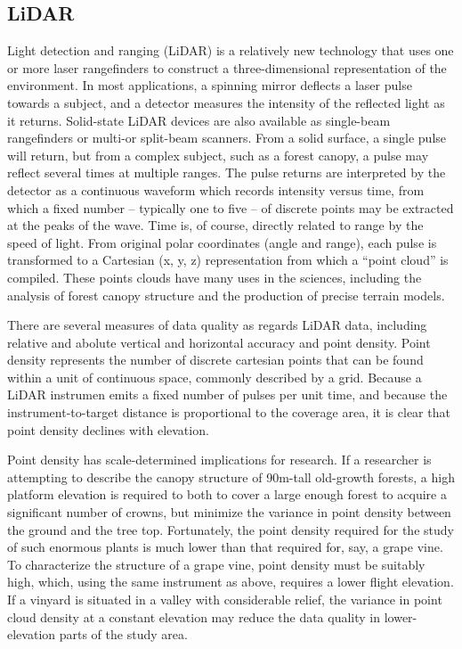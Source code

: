 \documentclass[10pt,a4paper]{report}
\begin{document}
\subsection{LiDAR}

Light detection and ranging (LiDAR) is a relatively new technology that uses one or more laser rangefinders to construct a three-dimensional representation of the environment. In most applications, a spinning mirror deflects a laser pulse towards a subject, and a detector measures the intensity of the reflected light as it returns. Solid-state LiDAR devices are also available as single-beam rangefinders or multi-or split-beam scanners. From a solid surface, a single pulse will return, but from a complex subject, such as a forest canopy, a pulse may reflect several times at multiple ranges. The pulse returns are interpreted by the detector as a continuous waveform which records intensity versus time, from which a fixed number -- typically one to five -- of discrete points may be extracted at the peaks of the wave. Time is, of course, directly related to range by the speed of light. From original polar coordinates (angle and range), each pulse is transformed to a Cartesian (x, y, z) representation from which a “point cloud” is compiled. These points clouds have many uses in the sciences, including the analysis of forest canopy structure and the production of precise terrain models. 

There are several measures of data quality as regards LiDAR data, including relative and abolute vertical and horizontal accuracy and point density. Point density represents the number of discrete cartesian points that can be found within a unit of continuous space, commonly described by a grid. Because a LiDAR instrumen emits a fixed number of pulses per unit time, and because the instrument-to-target distance is proportional to the coverage area, it is clear that point density declines with elevation. 

Point density has scale-determined implications for research. If a researcher is attempting to describe the canopy structure of 90m-tall old-growth forests, a high platform elevation is required to both to cover a large enough forest to acquire a significant number of crowns, but minimize the variance in point density between the ground and the tree top. Fortunately, the point density required for the study of such enormous plants is much lower than that required for, say, a grape vine. To characterize the structure of a grape vine, point density must be suitably high, which, using the same instrument as above, requires a lower flight elevation. If a vinyard is situated in a valley with considerable relief, the variance in point cloud density at a constant elevation may reduce the data quality in lower-elevation  parts of the study area.
\end{document}
